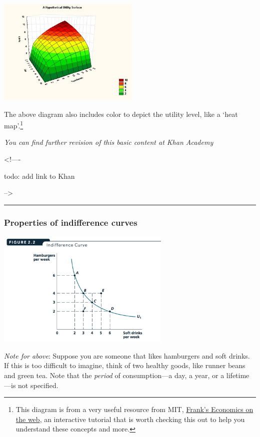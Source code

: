 \documentclass[]{article}
\begin{document}
\includegraphics[height=2in]{picsfigs/indif_utility_2_400.jpg}

The above diagram also includes color to depict the utility level, like
a `heat map'.\footnote{This diagram is from a very useful resource from
  MIT, \href{http://web.mit.edu/11.203/www/econ/}{Frank's Economics on
  the web}, an interactive tutorial that is worth checking this out to
  help you understand these concepts and more.}

\emph{You can find further revision of this basic content at Khan
Academy}

\textless!----

todo: add link to Khan

--\textgreater{}

\begin{center}\rule{0.5\linewidth}{\linethickness}\end{center}

\hypertarget{properties-of-indifference-curves}{%
\subsubsection{Properties of indifference
curves}\label{properties-of-indifference-curves}}

\includegraphics[height=2.2in]{picsfigs/indifccurve.png}

\emph{Note for above}: Suppose you are someone that likes hamburgers and
soft drinks. If this is too difficult to imagine, think of two healthy
goods, like runner beans and green tea. Note that the \emph{period} of
consumption---a day, a year, or a lifetime---is not specified.
\end{document}
